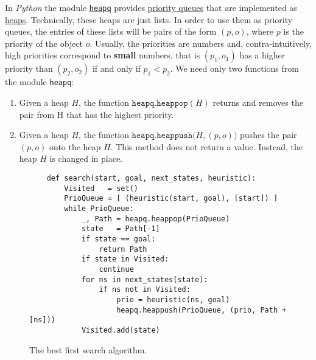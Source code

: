 In \textsl{Python} the module \href{https://docs.python.org/3.7/library/heapq.html}{\texttt{heapq}} provides 
\href{https://en.wikipedia.org/wiki/Priority_queue}{priority queues} that are implemented as 
\href{https://en.wikipedia.org/wiki/Heap_(data_structure)}{heaps}. 
Technically, these heaps are just lists.  In order to use them as priority queues, the entries of these lists
will be pairs of the form $(p, o)$, where $p$ is the priority of the object $o$.  Usually, the priorities are
numbers and, contra-intuitively, high priorities correspond to \textbf{small} numbers, that is $(p_1, o_1)$ has
a higher priority than $(p_2, o_2)$ if and only if $p_1 < p_2$. 
We need only two functions from the module \texttt{heapq}:
\begin{enumerate}
\item Given a heap $H$, the function $\texttt{heapq.heappop}(H)$ returns and removes the pair
      from H that has the highest priority.  
\item Given a heap $H$, the function $\texttt{heapq.heappush}\bigl(H, (p, o)\bigr)$  
      pushes the pair $(p, o)$ onto the heap $H$.  This method does not return a 
      value.  Instead, the heap $H$ is changed in place.
\end{enumerate}


\begin{figure}[!ht]
\centering
\begin{verbatim}
    def search(start, goal, next_states, heuristic):
        Visited   = set()
        PrioQueue = [ (heuristic(start, goal), [start]) ]
        while PrioQueue:
            _, Path = heapq.heappop(PrioQueue)
            state   = Path[-1]
            if state == goal:
                return Path
            if state in Visited:
                continue
            for ns in next_states(state):           
                if ns not in Visited:
                    prio = heuristic(ns, goal)
                    heapq.heappush(PrioQueue, (prio, Path + [ns]))
            Visited.add(state)
\end{verbatim}
\vspace*{-0.3cm}
\caption{The best first search algorithm.}
\label{fig:Best-First-Search.ipynb}
\end{figure}


